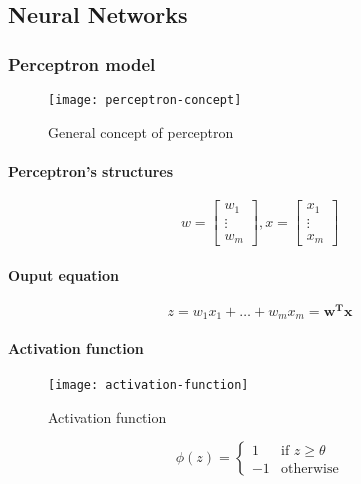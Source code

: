 \documentclass{article}
\begin{document}
		\subsection{Neural Networks}
		\label{sec:neural-networks}

			\subsubsection{Perceptron model}

			\begin{figure}
				\centering
				\texttt{[image: perceptron-concept]}
				\caption{General concept of perceptron}
				\label{fig:perceptron-concept}
			\end{figure}

			\paragraph{Perceptron's structures}
			\begin{equation}
				w = \begin{bmatrix}
						w_1 \\
						\vdots \\
						w_m
					\end{bmatrix}, x =
					\begin{bmatrix}
						x_1 \\
						\vdots \\
						x_m
					\end{bmatrix}
			\end{equation}

			\paragraph{Ouput equation}
			\begin{equation}
				z = w_1 x_1 + \dots + w_m x_m = \boldsymbol{w^T x}
			\end{equation}


			\paragraph{Activation function}

			\begin{figure}
				\centering
				\texttt{[image: activation-function]}
				\caption{Activation function}
				\label{fig:activation-function}
			\end{figure}

			\begin{equation}
				\phi(z) = \begin{cases}
					1 &\mbox{if } z \geq \theta \\
					-1 &\mbox{otherwise}
				\end{cases}
			\end{equation}
\end{document}
